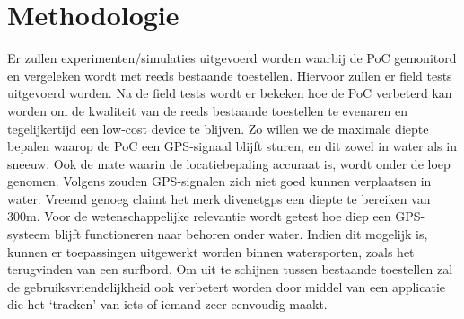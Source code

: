 \section{Methodologie}
\label{sec:methodologie}

Er zullen experimenten/simulaties uitgevoerd worden waarbij de PoC gemonitord en vergeleken wordt met reeds bestaande toestellen. Hiervoor zullen er field tests uitgevoerd worden.  Na de field tests wordt er bekeken hoe de PoC verbeterd kan worden om de kwaliteit van de reeds bestaande toestellen te evenaren en tegelijkertijd een low-cost device te blijven. 
Zo willen we de maximale diepte bepalen waarop de PoC een GPS-signaal blijft sturen, en dit zowel in water als in sneeuw. Ook de mate waarin de locatiebepaling accuraat is, wordt onder de loep genomen. 
Volgens \autocite{gps_water} zouden GPS-signalen zich niet goed kunnen verplaatsen in water. Vreemd genoeg claimt het merk divenetgps een diepte te bereiken van 300m. Voor de wetenschappelijke relevantie wordt getest hoe diep een GPS-systeem blijft functioneren naar behoren onder water. Indien dit mogelijk is, kunnen er toepassingen uitgewerkt worden binnen watersporten, zoals het terugvinden van een surfbord.
Om uit te schijnen tussen bestaande toestellen zal de gebruiksvriendelijkheid ook verbetert worden door middel van een applicatie die het ‘tracken’ van iets of iemand zeer eenvoudig maakt.



